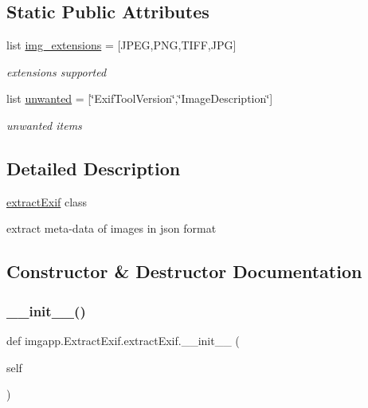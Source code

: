 \subsection*{Static Public Attributes}
\begin{DoxyCompactItemize}
\item 
list \hyperlink{classimgapp_1_1ExtractExif_1_1extractExif_a26ead2b001d94fe85271f120f8e6bd6d}{img\+\_\+extensions} = \mbox{[}\textquotesingle{}J\+P\+EG\textquotesingle{},\textquotesingle{}P\+NG\textquotesingle{},\textquotesingle{}T\+I\+FF\textquotesingle{},\textquotesingle{}J\+PG\textquotesingle{}\mbox{]}
\begin{DoxyCompactList}\small\item\em extensions supported \end{DoxyCompactList}\item 
list \hyperlink{classimgapp_1_1ExtractExif_1_1extractExif_a7714ec5711d96ee96004f6584ff30981}{unwanted} = \mbox{[}\char`\"{}Exif\+Tool\+Version\char`\"{},\char`\"{}Image\+Description\char`\"{}\mbox{]}
\begin{DoxyCompactList}\small\item\em unwanted items \end{DoxyCompactList}\end{DoxyCompactItemize}


\subsection{Detailed Description}
\hyperlink{classimgapp_1_1ExtractExif_1_1extractExif}{extract\+Exif} class 

extract meta-\/data of images in json format 

\subsection{Constructor \& Destructor Documentation}
\mbox{\label{classimgapp_1_1ExtractExif_1_1extractExif_a8ae006214e9d8a2f8f65f835f2d98808}} 
\subsubsection{\texorpdfstring{\+\_\+\+\_\+init\+\_\+\+\_\+()}{\_\_init\_\_()}}
{\footnotesize\ttfamily def imgapp.\+Extract\+Exif.\+extract\+Exif.\+\_\+\+\_\+init\+\_\+\+\_\+ (\begin{DoxyParamCaption}\item[{}]{self }\end{DoxyParamCaption})}



